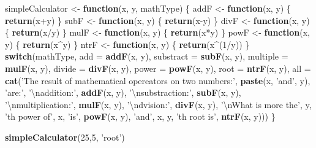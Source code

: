 \documentclass[]{book}
\newenvironment{Shaded}{\begin{snugshade}}{\end{snugshade}}
\newcommand{\KeywordTok}[1]{\textcolor[rgb]{0.12,0.11,0.11}{\textbf{#1}}}
\newcommand{\DataTypeTok}[1]{\textcolor[rgb]{0.00,0.34,0.68}{#1}}
\newcommand{\DecValTok}[1]{\textcolor[rgb]{0.69,0.50,0.00}{#1}}
\newcommand{\CharTok}[1]{\textcolor[rgb]{0.57,0.30,0.62}{#1}}
\newcommand{\StringTok}[1]{\textcolor[rgb]{0.75,0.01,0.01}{#1}}
\newcommand{\ControlFlowTok}[1]{\textcolor[rgb]{0.12,0.11,0.11}{\textbf{#1}}}
\newcommand{\OperatorTok}[1]{\textcolor[rgb]{0.12,0.11,0.11}{#1}}
\newcommand{\NormalTok}[1]{\textcolor[rgb]{0.12,0.11,0.11}{#1}}
\theoremstyle{definition}
\theoremstyle{definition}
\theoremstyle{definition}
\theoremstyle{remark}
\begin{document}
\begin{Shaded}
\begin{Highlighting}[]
\NormalTok{simpleCalculator <-}\StringTok{ }\ControlFlowTok{function}\NormalTok{(x, y, mathType) \{}
\NormalTok{  addF <-}\StringTok{ }\ControlFlowTok{function}\NormalTok{(x, y) \{}
  \KeywordTok{return}\NormalTok{(x}\OperatorTok{+}\NormalTok{y)}
\NormalTok{  \}}
\NormalTok{  subF <-}\StringTok{ }\ControlFlowTok{function}\NormalTok{(x, y) \{}
  \KeywordTok{return}\NormalTok{(x}\OperatorTok{-}\NormalTok{y)}
\NormalTok{  \}}
\NormalTok{  divF <-}\StringTok{ }\ControlFlowTok{function}\NormalTok{(x, y) \{}
  \KeywordTok{return}\NormalTok{(x}\OperatorTok{/}\NormalTok{y)}
\NormalTok{  \}}
\NormalTok{  mulF <-}\StringTok{ }\ControlFlowTok{function}\NormalTok{(x, y) \{}
  \KeywordTok{return}\NormalTok{(x}\OperatorTok{*}\NormalTok{y)}
\NormalTok{  \}}
\NormalTok{  powF <-}\StringTok{ }\ControlFlowTok{function}\NormalTok{(x, y) \{}
  \KeywordTok{return}\NormalTok{(x}\OperatorTok{^}\NormalTok{y)}
\NormalTok{  \}}
\NormalTok{  ntrF <-}\StringTok{ }\ControlFlowTok{function}\NormalTok{(x, y) \{}
  \KeywordTok{return}\NormalTok{(x}\OperatorTok{^}\NormalTok{(}\DecValTok{1}\OperatorTok{/}\NormalTok{y))}
\NormalTok{  \}}
  \ControlFlowTok{switch}\NormalTok{(mathType,}
         \DataTypeTok{add =} \KeywordTok{addF}\NormalTok{(x, y),}
         \DataTypeTok{substract =} \KeywordTok{subF}\NormalTok{(x, y),}
         \DataTypeTok{multiple =} \KeywordTok{mulF}\NormalTok{(x, y),}
         \DataTypeTok{divide =} \KeywordTok{divF}\NormalTok{(x, y),}
         \DataTypeTok{power =} \KeywordTok{powF}\NormalTok{(x, y),}
         \DataTypeTok{root =} \KeywordTok{ntrF}\NormalTok{(x, y),}
         \DataTypeTok{all =} \KeywordTok{cat}\NormalTok{(}\StringTok{'The result of mathematical opereators on two numbers:'}\NormalTok{,}
                      \KeywordTok{paste}\NormalTok{(x, }\StringTok{'and'}\NormalTok{, y), }\StringTok{'are:'}\NormalTok{, }\StringTok{'}\CharTok{\textbackslash{}n}\StringTok{addition:'}\NormalTok{, }\KeywordTok{addF}\NormalTok{(x, y),}
                      \StringTok{'}\CharTok{\textbackslash{}n}\StringTok{substraction:'}\NormalTok{, }\KeywordTok{subF}\NormalTok{(x, y), }\StringTok{'}\CharTok{\textbackslash{}n}\StringTok{multiplication:'}\NormalTok{, }\KeywordTok{mulF}\NormalTok{(x, y),}
                      \StringTok{'}\CharTok{\textbackslash{}n}\StringTok{dvision:'}\NormalTok{, }\KeywordTok{divF}\NormalTok{(x, y), }\StringTok{'}\CharTok{\textbackslash{}n}\StringTok{What is more the'}\NormalTok{, y,}
                      \StringTok{'th power of'}\NormalTok{, x, }\StringTok{'is'}\NormalTok{, }\KeywordTok{powF}\NormalTok{(x, y), }\StringTok{'and'}\NormalTok{, x, y,}
                      \StringTok{'th root is'}\NormalTok{, }\KeywordTok{ntrF}\NormalTok{(x, y)))}
\NormalTok{\}}

\KeywordTok{simpleCalculator}\NormalTok{(}\DecValTok{25}\NormalTok{,}\DecValTok{5}\NormalTok{, }\StringTok{'root'}\NormalTok{)}
\end{Highlighting}
\end{Shaded}
\end{document}
